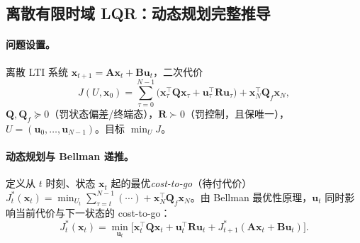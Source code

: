 \subsection{离散有限时域 LQR：动态规划完整推导}
\label{sec:ctrl-lqr-dp}

\paragraph{问题设置。}
离散 LTI 系统 $\mathbf{x}_{t+1}=\mathbf{A}\mathbf{x}_t+\mathbf{B}\mathbf{u}_t$，二次代价\cite{bansal2017lqr}
\begin{equation}
  J(U,\mathbf{x}_0)=\sum_{\tau=0}^{N-1}\big(\mathbf{x}_\tau^\top\mathbf{Q}\mathbf{x}_\tau+\mathbf{u}_\tau^\top\mathbf{R}\mathbf{u}_\tau\big)+\mathbf{x}_N^\top\mathbf{Q}_f\mathbf{x}_N,
  \label{eq:ctrl-lqr-cost}
\end{equation}
$\mathbf{Q},\mathbf{Q}_f\succeq0$（罚状态偏差/终端态），$\mathbf{R}\succ0$（罚控制，且保唯一），$U=(\mathbf{u}_0,\dots,\mathbf{u}_{N-1})$。目标 $\min_U J$。

\paragraph{动态规划与 Bellman 递推。}
定义从 $t$ 时刻、状态 $\mathbf{x}_t$ 起的最优\emph{cost-to-go}（待付代价）$J_t^*(\mathbf{x}_t)=\min_{U_t}\sum_{\tau=t}^{N-1}(\cdots)+\mathbf{x}_N^\top\mathbf{Q}_f\mathbf{x}_N$。由 Bellman 最优性原理，$\mathbf{u}_t$ 同时影响当前代价与下一状态的 cost-to-go\cite{bansal2017lqr}：
\begin{equation}
  J_t^*(\mathbf{x}_t)=\min_{\mathbf{u}_t}\Big[\mathbf{x}_t^\top\mathbf{Q}\mathbf{x}_t+\mathbf{u}_t^\top\mathbf{R}\mathbf{u}_t+J_{t+1}^*(\mathbf{A}\mathbf{x}_t+\mathbf{B}\mathbf{u}_t)\Big].
  \label{eq:ctrl-bellman}
\end{equation}

